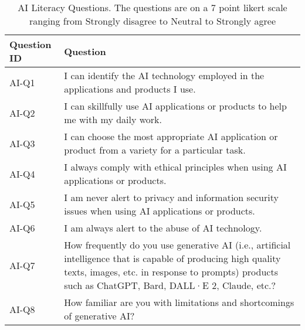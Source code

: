 \begin{table}[!hbpt]
    \footnotesize
    \centering
    \begin{tabularx}{\linewidth}{l|X}
    \toprule
         Question ID & Question\\
         \midrule
         AI-Q1 & I can identify the AI technology employed in the applications and products I use. \\
         AI-Q2 & I can skillfully use AI applications or products to help me with my daily work. \\
         AI-Q3 & I can choose the most appropriate AI application or product from a variety for a particular task. \\
         AI-Q4 & I always comply with ethical principles when using AI applications or products. \\
         AI-Q5 & I am never alert to privacy and information security issues when using AI applications or products. \\
         AI-Q6 & I am always alert to the abuse of AI technology. \\
         AI-Q7 & How frequently do you use generative AI (i.e., artificial intelligence that is capable of producing high quality texts, images, etc. in response to prompts) products such as ChatGPT, Bard, DALL·E 2, Claude, etc.? \\
         AI-Q8 & How familiar are you with limitations and shortcomings of generative AI? \\
    \bottomrule
    \end{tabularx}
    \caption{AI Literacy Questions. The questions are on a 7 point likert scale ranging from Strongly disagree to Neutral to Strongly agree}
    \label{app:ai-literacy-questions}
\end{table}